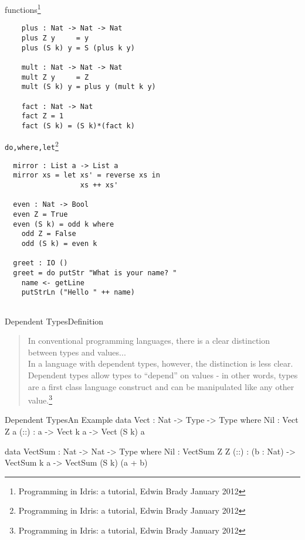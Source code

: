 \documentclass[rail]{beamer}
\begin{document}
\begin{frame}[fragile]{\idris}
  {functions\footnote[frame,1]
    {Programming in Idris: a tutorial, Edwin Brady January 2012}}
  \begin{lstlisting}
    plus : Nat -> Nat -> Nat
    plus Z y     = y
    plus (S k) y = S (plus k y)

    mult : Nat -> Nat -> Nat
    mult Z y     = Z
    mult (S k) y = plus y (mult k y)

    fact : Nat -> Nat
    fact Z = 1
    fact (S k) = (S k)*(fact k)
  \end{lstlisting}
\end{frame}

\begin{frame}[fragile]{\idris}
  {\texttt{do,where,let}\footnote[frame,1]
    {Programming in Idris: a tutorial, Edwin Brady January 2012}}
\begin{lstlisting}
  mirror : List a -> List a
  mirror xs = let xs' = reverse xs in
                  xs ++ xs'

  even : Nat -> Bool
  even Z = True
  even (S k) = odd k where
    odd Z = False
    odd (S k) = even k

  greet : IO ()
  greet = do putStr "What is your name? "
    name <- getLine
    putStrLn ("Hello " ++ name)


\end{lstlisting}
\end{frame}

\begin{frame}{Dependent Types}{Definition}
  \begin{quotation}
    In conventional programming languages, there is a clear
    distinction between types and values... \\
    In a language with dependent types, however, the distinction is
    less clear. Dependent types allow types to ``depend'' on values -
    in other words, types are a first class language construct and can
    be manipulated like any other value.\footnote[frame,1]
    {Programming in Idris: a tutorial, Edwin Brady January 2012}
  \end{quotation}
\end{frame}

\begin{frame}{Dependent Types}{An Example}
  data Vect : Nat -> Type -> Type where
    Nil : Vect Z a
    (::) : a -> Vect k a -> Vect (S k) a

    data VectSum : Nat -> Nat -> Type where
      Nil : VectSum Z Z
      (::) : (b : Nat) -> VectSum k a -> VectSum (S k) (a + b)

\end{frame}
\end{document}
